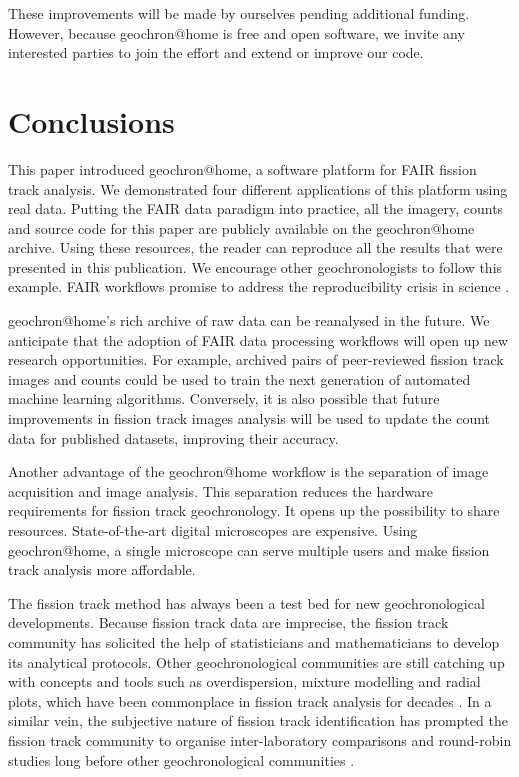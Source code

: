 \documentclass[gchron, manuscript]{copernicus}
\begin{document}
These improvements will be made by ourselves pending additional
funding. However, because geochron@home is free and open software, we
invite any interested parties to join the effort and extend or improve
our code.

\section{Conclusions}\label{sec:conclusions}

This paper introduced geochron@home, a software platform for FAIR
fission track analysis. We demonstrated four different applications of
this platform using real data. Putting the FAIR data paradigm into
practice, all the imagery, counts and source code for this paper are
publicly available on the geochron@home archive. Using these
resources, the reader can reproduce all the results that were
presented in this publication.  We encourage other geochronologists to
follow this example.  FAIR workflows promise to address the
reproducibility crisis in science \citep{miyakawa2020}.\medskip

geochron@home's rich archive of raw data can be reanalysed in
the future. We anticipate that the adoption of FAIR data processing
workflows will open up new research opportunities. For example,
archived pairs of peer-reviewed fission track images and counts could
be used to train the next generation of automated machine learning
algorithms. Conversely, it is also possible that future improvements
in fission track images analysis will be used to update the count data
for published datasets, improving their accuracy.\medskip

Another advantage of the geochron@home workflow is the separation of
image acquisition and image analysis. This separation reduces the
hardware requirements for fission track geochronology. It opens up the
possibility to share resources. State-of-the-art digital microscopes
are expensive. Using geochron@home, a single microscope can serve
multiple users and make fission track analysis more
affordable.\medskip

The fission track method has always been a test bed for new
geochronological developments.  Because fission track data are
imprecise, the fission track community has solicited the help of
statisticians and mathematicians to develop its analytical protocols.
Other geochronological communities are still catching up with concepts
and tools such as overdispersion, mixture modelling and radial plots,
which have been commonplace in fission track analysis for decades
\citep{vermeesch2019b}. In a similar vein, the subjective nature of
fission track identification has prompted the fission track community
to organise inter-laboratory comparisons and round-robin studies long
before other geochronological communities
\citep{miller1985,tamer2025}.\medskip
\end{document}
